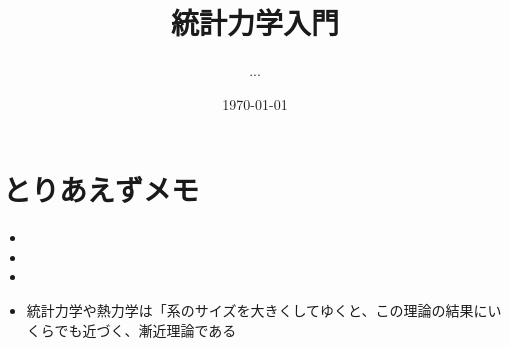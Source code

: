 \documentclass[11pt,a4paper]{jsarticle}
\title{統計力学入門}
\author{...}
\date{\today}
\begin{document}
\maketitle
%
%
\section{とりあえずメモ}
\begin{itemize}
    \item {}
    \item {}
    \item {}
    \item 統計力学や熱力学は「系のサイズを大きくしてゆくと、この理論の結果にいくらでも近づく、漸近理論である


    \end{itemize}

%
%
\end{document}
